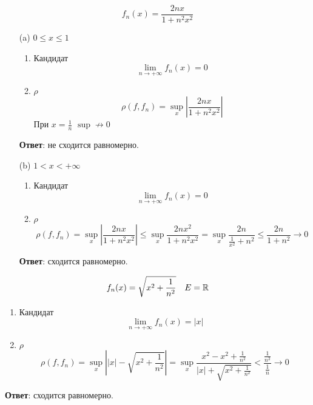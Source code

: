 \begin{exercise}[2752]
    \[f_n(x) = \frac{2nx}{1 + n^2x^2}\]

    \begin{itemize}
        \item [(a)] \(0 \leq x \leq 1\)

              \begin{enumerate}
                  \item Кандидат
                        \[\lim_{n\to +\infty} f_n(x) = 0\]
                  \item \(\rho\)
                        \[\rho(f, f_n) = \sup_{x} \left|\frac{2nx}{1 + n^2x^2}\right|\]
                        При \(x = \frac{1}{n}\) \(\sup\not\to 0\)
              \end{enumerate}

              \textbf{Ответ}: не сходится равномерно.

        \item [(b)] \(1 < x < +\infty\)

              \begin{enumerate}
                  \item Кандидат
                        \[\lim_{n\to +\infty} f_n(x) = 0\]
                  \item \(\rho\)
                        \[\rho(f, f_n) = \sup_{x} \left|\frac{2nx}{1 + n^2x^2}\right| \leq \sup_{x} \frac{2nx^2}{1 + n^2x^2} = \sup_{x} \frac{2n}{\frac{1}{x^2} + n^2} \leq \frac{2n}{1 + n^2} \to 0\]
              \end{enumerate}

              \textbf{Ответ}: сходится равномерно.
    \end{itemize}
\end{exercise}

\begin{exercise}[2753]
    \[f_n(x) = \sqrt{x^2 + \frac{1}{n^2}} \quad E = \mathbb{R}\]

    \begin{enumerate}
        \item Кандидат
              \[\lim_{n\to +\infty} f_n(x) = |x|\]
        \item \(\rho\)
              \[\rho(f, f_n) = \sup_{x} \left||x| - \sqrt{x^2 + \frac{1}{n^2}}\right| = \sup_x \frac{x^2 - x^2 + \frac{1}{n^2}}{|x| + \sqrt{x^2 + \frac{1}{n^2}}} < \frac{\frac{1}{n^2}}{\frac{1}{n}} \to 0\]
    \end{enumerate}

    \textbf{Ответ}: сходится равномерно.
\end{exercise}

